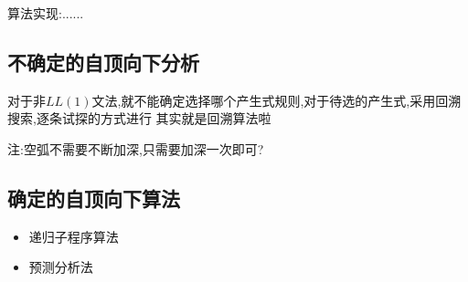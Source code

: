 \documentclass[UTF8,a4paper]{ctexart}
\begin{document}
算法实现:......


\subsection{不确定的自顶向下分析}
对于非$LL(1)$文法,就不能确定选择哪个产生式规则,对于待选的产生式,采用回溯搜索,逐条试探的方式进行
其实就是回溯算法啦

注:空弧不需要不断加深,只需要加深一次即可?

\subsection{确定的自顶向下算法}
\begin{itemize}
  \item 递归子程序算法
  \item 预测分析法
\end{itemize}
\end{document}
